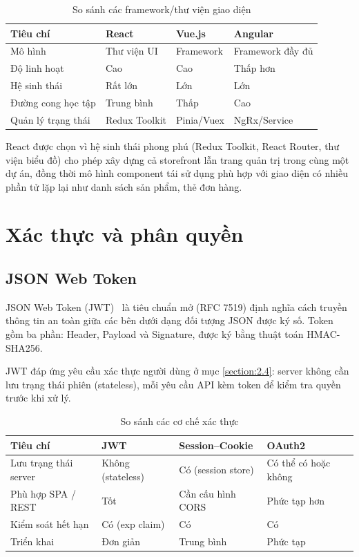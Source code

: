 \documentclass[../DoAn.tex]{subfiles}
\begin{document}
\begin{table}[H]
\centering
\caption{So sánh các framework/thư viện giao diện}
\label{tab:frontend}
\begin{tabular}{|p{3.5cm}|p{3cm}|p{3cm}|p{3cm}|}
\hline
\textbf{Tiêu chí} & \textbf{React} & \textbf{Vue.js} & \textbf{Angular} \\
\hline
Mô hình & Thư viện UI & Framework & Framework đầy đủ \\
\hline
Độ linh hoạt & Cao & Cao & Thấp hơn \\
\hline
Hệ sinh thái & Rất lớn & Lớn & Lớn \\
\hline
Đường cong học tập & Trung bình & Thấp & Cao \\
\hline
Quản lý trạng thái & Redux Toolkit & Pinia/Vuex & NgRx/Service \\
\hline
\end{tabular}
\end{table}

React được chọn vì hệ sinh thái phong phú (Redux Toolkit, React Router, thư viện
biểu đồ) cho phép xây dựng cả storefront lẫn trang quản trị trong cùng một dự
án, đồng thời mô hình component tái sử dụng phù hợp với giao diện có nhiều phần
tử lặp lại như danh sách sản phẩm, thẻ đơn hàng.

\section{Xác thực và phân quyền}
\label{section:3.5}

\subsection{JSON Web Token}
\label{subsection:3.5.1}

JSON Web Token (JWT)~\cite{rfc7519} là tiêu chuẩn mở (RFC 7519) định nghĩa cách
truyền thông tin an toàn giữa các bên dưới dạng đối tượng JSON được ký số. Token
gồm ba phần: Header, Payload và Signature, được ký bằng thuật toán HMAC-SHA256.

JWT đáp ứng yêu cầu xác thực người dùng ở mục \ref{section:2.4}: server không cần
lưu trạng thái phiên (stateless), mỗi yêu cầu API kèm token để kiểm tra quyền
trước khi xử lý.

\begin{table}[H]
\centering
\caption{So sánh các cơ chế xác thực}
\label{tab:auth}
\begin{tabular}{|p{3.5cm}|p{3.2cm}|p{3.2cm}|p{2.8cm}|}
\hline
\textbf{Tiêu chí} & \textbf{JWT} & \textbf{Session--Cookie} & \textbf{OAuth2} \\
\hline
Lưu trạng thái server & Không (stateless) & Có (session store) & Có thể có hoặc không \\
\hline
Phù hợp SPA / REST & Tốt & Cần cấu hình CORS & Phức tạp hơn \\
\hline
Kiểm soát hết hạn & Có (exp claim) & Có & Có \\
\hline
Triển khai & Đơn giản & Trung bình & Phức tạp \\
\hline
\end{tabular}
\end{table}
\end{document}
